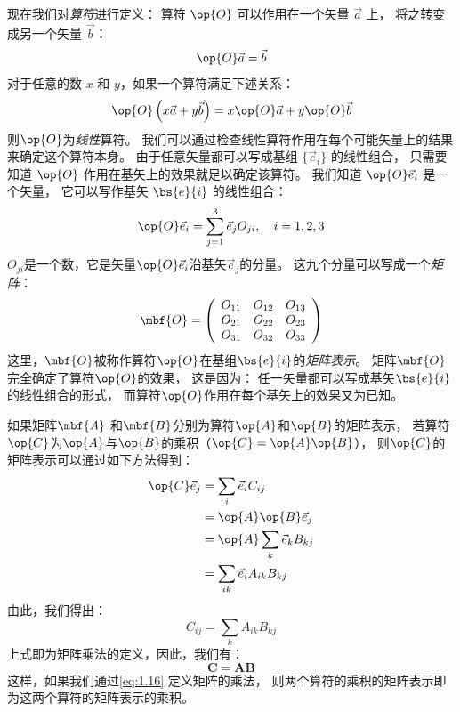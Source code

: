 现在我们对\emph{算符}进行定义：
算符 $\op{O}$ 可以作用在一个矢量 $\vec{a}$ 上，
将之转变成另一个矢量 $\vec{b}$：
\begin{equation}
 \op{O}\vec{a} = \vec{b}
 \label{eq:1.11}
\end{equation}
对于任意的数 $x$ 和 $y$，如果一个算符满足下述关系：
\begin{equation}
 \op{O}\left(x\vec{a} + y\vec{b}\right) = x\op{O}\vec{a} + y\op{O}\vec{b}
 \label{eq:1.12}
\end{equation}
则$\op{O}$为\emph{线性}算符。
我们可以通过检查线性算符作用在每个可能矢量上的结果来确定这个算符本身。
由于任意矢量都可以写成基组 $\{\vec{e}_i\}$ 的线性组合，
只需要知道 $\op{O}$ 作用在基矢上的效果就足以确定该算符。
我们知道 $\op{O}\vec{e}_i$ 是一个矢量，
它可以写作基矢 $\bs{e}{i}$ 的线性组合：
\begin{equation}
 \op{O}\vec{e}_i = \sum_{j=1}^3 \vec{e}_j O_{ji}, \quad i = 1, 2, 3
 \label{eq:1.13}
\end{equation}
$O_{ji}$是一个数，它是矢量$\op{O}\vec{e}_i$沿基矢$\vec{e}_j$的分量。
这九个分量可以写成一个\emph{矩阵}：
\begin{equation}
 \mbf{O} = \left(
 \begin{array}{ccc}
     O_{11} &O_{12} &O_{13} \\
     O_{21} &O_{22} &O_{23} \\
     O_{31} &O_{32} &O_{33} \\
 \end{array}
 \right)
 \label{eq:1.14}
\end{equation}
这里，$\mbf{O}$被称作算符$\op{O}$在基组$\bs{e}{i}$的\emph{矩阵表示}。
矩阵$\mbf{O}$完全确定了算符$\op{O}$的效果，
这是因为：
任一矢量都可以写成基矢$\bs{e}{i}$的线性组合的形式，
而算符$\op{O}$作用在每个基矢上的效果又为已知。


如果矩阵$\mbf{A}$ 和$\mbf{B}$分别为算符$\op{A}$和$\op{B}$的矩阵表示， 
若算符$\op{C}$为$\op{A}$与$\op{B}$的乘积（$\op{C} = \op{A}\op{B}$），
则$\op{C}$的矩阵表示可以通过如下方法得到：
\begin{equation}
 \begin{split}
 \op{C}\vec{e}_j &= \sum_i \vec{e}_i C_{ij} \\
 &= \op{A}\op{B} \vec{e}_j \\
 &= \op{A}\sum_k \vec{e}_k B_{kj} \\
 &= \sum_{ik} \vec{e}_i A_{ik}B_{kj}
 \end{split} 
 \label{eq:1.15}
\end{equation}
由此，我们得出：
\begin{equation}
 C_{ij} = \sum_k A_{ik}B_{kj}
 \label{eq:1.16}
\end{equation}
上式即为矩阵乘法的定义，因此，我们有：
\begin{equation}
 \mathbf{C} = \mathbf{A}\mathbf{B}
 \label{eq:1.17}
\end{equation}
这样，如果我们通过\autoref{eq:1.16} 定义矩阵的乘法，
则两个算符的乘积的矩阵表示即为这两个算符的矩阵表示的乘积。

